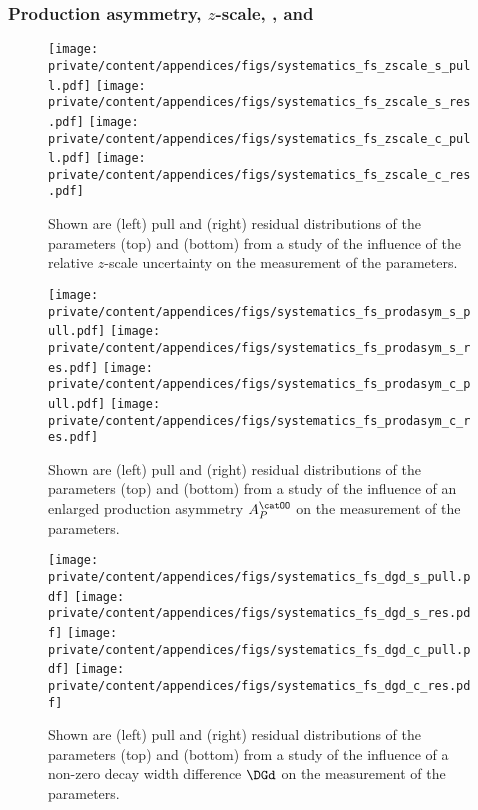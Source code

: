 \FloatBarrier
\subsubsection[Production asymmetry, $z$-scale, DMd, and DGd]{Production asymmetry, $z$-scale, \DMd, and \DGd}
\label{sec:app:measurement_of_sin2beta:systematics:systematics:further_studies}

\begin{figure}[h]
  \texttt{[image: private/content/appendices/figs/systematics\_fs\_zscale\_s\_pull.pdf]}\hfill
  \texttt{[image: private/content/appendices/figs/systematics\_fs\_zscale\_s\_res.pdf]}
  \texttt{[image: private/content/appendices/figs/systematics\_fs\_zscale\_c\_pull.pdf]}\hfill
  \texttt{[image: private/content/appendices/figs/systematics\_fs\_zscale\_c\_res.pdf]}
\caption{Shown are (left) pull and (right) residual distributions of the
parameters (top) \SJpsiKS and (bottom) \CJpsiKS from a \ToyMC study of the
influence of the relative $z$-scale uncertainty on the measurement of the \CP
parameters.}
\label{fig:app:measurement_of_sin2beta:systematics:systematics:further_studies:zscale}
\end{figure}

\begin{figure}[h]
  \texttt{[image: private/content/appendices/figs/systematics\_fs\_prodasym\_s\_pull.pdf]}\hfill
  \texttt{[image: private/content/appendices/figs/systematics\_fs\_prodasym\_s\_res.pdf]}
  \texttt{[image: private/content/appendices/figs/systematics\_fs\_prodasym\_c\_pull.pdf]}\hfill
  \texttt{[image: private/content/appendices/figs/systematics\_fs\_prodasym\_c\_res.pdf]}
\caption{Shown are (left) pull and (right) residual distributions of the
parameters (top) \SJpsiKS and (bottom) \CJpsiKS from a \ToyMC study of the
influence of an enlarged production asymmetry $A_P^{\catOO}$ on the measurement
of the \CP parameters.}
\label{fig:app:measurement_of_sin2beta:systematics:systematics:further_studies:production_asymmetry}
\end{figure}

\begin{figure}[h]
  \texttt{[image: private/content/appendices/figs/systematics\_fs\_dgd\_s\_pull.pdf]}\hfill
  \texttt{[image: private/content/appendices/figs/systematics\_fs\_dgd\_s\_res.pdf]}
  \texttt{[image: private/content/appendices/figs/systematics\_fs\_dgd\_c\_pull.pdf]}\hfill
  \texttt{[image: private/content/appendices/figs/systematics\_fs\_dgd\_c\_res.pdf]}
\caption{Shown are (left) pull and (right) residual distributions of the
parameters (top) \SJpsiKS and (bottom) \CJpsiKS from a \ToyMC study of the
influence of a non-zero decay width difference $\DGd$ on the measurement
of the \CP parameters.}
\label{fig:app:measurement_of_sin2beta:systematics:systematics:further_studies:decay_width_difference}
\end{figure}

